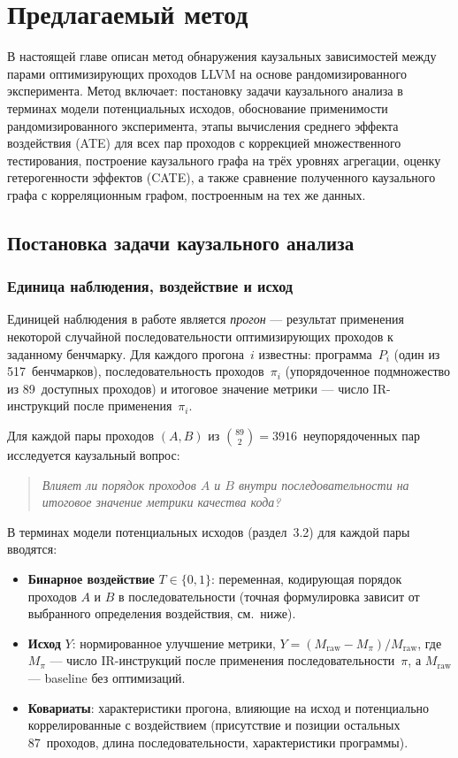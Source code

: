 \section{Предлагаемый метод}

В настоящей главе описан метод обнаружения каузальных зависимостей между парами оптимизирующих проходов LLVM на основе рандомизированного эксперимента. Метод включает: постановку задачи каузального анализа в терминах модели потенциальных исходов, обоснование применимости рандомизированного эксперимента, этапы вычисления среднего эффекта воздействия (ATE) для всех пар проходов с коррекцией множественного тестирования, построение каузального графа на трёх уровнях агрегации, оценку гетерогенности эффектов (CATE), а также сравнение полученного каузального графа с корреляционным графом, построенным на тех же данных.

\subsection{Постановка задачи каузального анализа}

\subsubsection{Единица наблюдения, воздействие и исход}

Единицей наблюдения в работе является \emph{прогон} --- результат применения некоторой случайной последовательности оптимизирующих проходов к заданному бенчмарку. Для каждого прогона~$i$ известны: программа~$P_i$ (один из 517~бенчмарков), последовательность проходов~$\pi_i$ (упорядоченное подмножество из 89~доступных проходов) и итоговое значение метрики --- число IR-инструкций после применения~$\pi_i$.

Для каждой пары проходов $(A, B)$ из $\binom{89}{2} = 3916$~неупорядоченных пар исследуется каузальный вопрос:
\begin{quote}
    \emph{Влияет ли порядок проходов $A$ и $B$ внутри последовательности на итоговое значение метрики качества кода?}
\end{quote}

В терминах модели потенциальных исходов (раздел~3.2) для каждой пары вводятся:

\begin{itemize}
    \item \textbf{Бинарное воздействие} $T \in \{0, 1\}$: переменная, кодирующая порядок проходов $A$ и $B$ в последовательности (точная формулировка зависит от выбранного определения воздействия, см.~ниже).
    \item \textbf{Исход} $Y$: нормированное улучшение метрики, $Y = (M_{\text{raw}} - M_\pi) / M_{\text{raw}}$, где $M_\pi$ --- число IR-инструкций после применения последовательности~$\pi$, а $M_{\text{raw}}$ --- baseline без оптимизаций.
    \item \textbf{Ковариаты}: характеристики прогона, влияющие на исход и потенциально коррелированные с воздействием (присутствие и позиции остальных 87~проходов, длина последовательности, характеристики программы).
\end{itemize}

